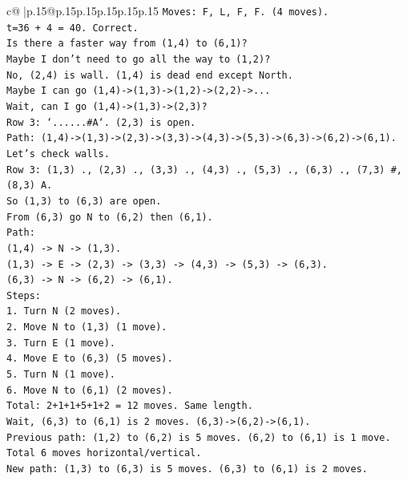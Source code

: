 \documentclass{article}
\begin{document}
{\begin{supertabular}{c@{$\;$}|p{.15\linewidth}@{}p{.15\linewidth}p{.15\linewidth}p{.15\linewidth}p{.15\linewidth}p{.15\linewidth}}
{{{\texttt{Moves: F, L, F, F. (4 moves).} \\
\texttt{t=36 + 4 = 40. Correct.} \\
\texttt{Is there a faster way from (1,4) to (6,1)?} \\
\texttt{Maybe I don't need to go all the way to (1,2)?} \\
\texttt{No, (2,4) is wall. (1,4) is dead end except North.} \\
\texttt{Maybe I can go (1,4){-}>(1,3){-}>(1,2){-}>(2,2){-}>...} \\
\texttt{Wait, can I go (1,4){-}>(1,3){-}>(2,3)?} \\
\texttt{Row 3: `......\#A`. (2,3) is open.} \\
\texttt{Path: (1,4){-}>(1,3){-}>(2,3){-}>(3,3){-}>(4,3){-}>(5,3){-}>(6,3){-}>(6,2){-}>(6,1).} \\
\texttt{Let's check walls.} \\
\texttt{Row 3: (1,3) ., (2,3) ., (3,3) ., (4,3) ., (5,3) ., (6,3) ., (7,3) \#, (8,3) A.} \\
\texttt{So (1,3) to (6,3) are open.} \\
\texttt{From (6,3) go N to (6,2) then (6,1).} \\
\texttt{Path:} \\
\texttt{(1,4) {-}> N {-}> (1,3).} \\
\texttt{(1,3) {-}> E {-}> (2,3) {-}> (3,3) {-}> (4,3) {-}> (5,3) {-}> (6,3).} \\
\texttt{(6,3) {-}> N {-}> (6,2) {-}> (6,1).} \\
\texttt{Steps:} \\
\texttt{1. Turn N (2 moves).} \\
\texttt{2. Move N to (1,3) (1 move).} \\
\texttt{3. Turn E (1 move).} \\
\texttt{4. Move E to (6,3) (5 moves).} \\
\texttt{5. Turn N (1 move).} \\
\texttt{6. Move N to (6,1) (2 moves).} \\
\texttt{Total: 2+1+1+5+1+2 = 12 moves. Same length.} \\
\texttt{Wait, (6,3) to (6,1) is 2 moves. (6,3){-}>(6,2){-}>(6,1).} \\
\texttt{Previous path: (1,2) to (6,2) is 5 moves. (6,2) to (6,1) is 1 move.} \\
\texttt{Total 6 moves horizontal/vertical.} \\
\texttt{New path: (1,3) to (6,3) is 5 moves. (6,3) to (6,1) is 2 moves.} \\
}}}
\end{supertabular}}
\end{document}

